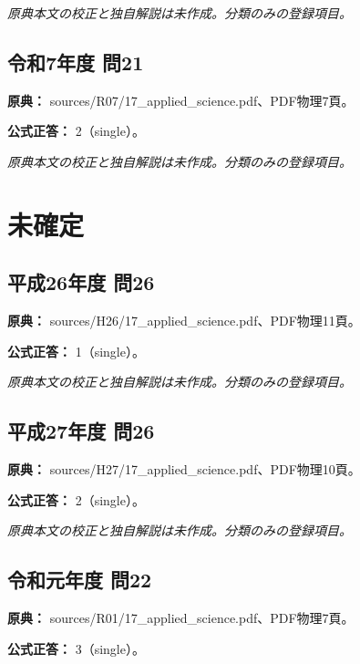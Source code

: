 \par\textit{原典本文の校正と独自解説は未作成。分類のみの登録項目。}

\subsection{令和7年度 問21}
\label{q:r07-reg-applied-21}

\noindent\textbf{原典：} sources/R07/17\_applied\_science.pdf、PDF物理7頁。

\textbf{公式正答：} 2（single）。

\par\textit{原典本文の校正と独自解説は未作成。分類のみの登録項目。}

\section{未確定}

\subsection{平成26年度 問26}
\label{q:h26-reg-applied-26}

\noindent\textbf{原典：} sources/H26/17\_applied\_science.pdf、PDF物理11頁。

\textbf{公式正答：} 1（single）。

\par\textit{原典本文の校正と独自解説は未作成。分類のみの登録項目。}

\subsection{平成27年度 問26}
\label{q:h27-reg-applied-26}

\noindent\textbf{原典：} sources/H27/17\_applied\_science.pdf、PDF物理10頁。

\textbf{公式正答：} 2（single）。

\par\textit{原典本文の校正と独自解説は未作成。分類のみの登録項目。}

\subsection{令和元年度 問22}
\label{q:r01-reg-applied-22}

\noindent\textbf{原典：} sources/R01/17\_applied\_science.pdf、PDF物理7頁。

\textbf{公式正答：} 3（single）。

